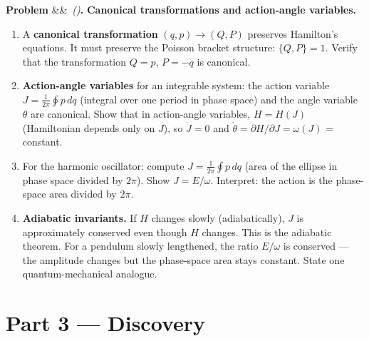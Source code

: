 \documentclass[12pt,a4paper]{article}
\newcounter{problem}
\newenvironment{problem}[1][]{\refstepcounter{problem}\par\vspace{6pt}\noindent\textbf{\color{MidBlue}Problem \theproblem}\ifx&#1&\else\ \textit{(#1)}\fi\textbf{.}\enskip}{\par\vspace{4pt}}
\begin{document}
\begin{problem}
\label{prob:canonical}
\textbf{Canonical transformations and action-angle variables.}
\begin{enumerate}[label=(\alph*),topsep=2pt]
  \item A \textbf{canonical transformation} $(q,p)\to(Q,P)$ preserves Hamilton's equations. It must preserve the Poisson bracket structure: $\{Q,P\}=1$. Verify that the transformation $Q=p$, $P=-q$ is canonical.
  \item \textbf{Action-angle variables} for an integrable system: the action variable $J = \frac{1}{2\pi}\oint p\,dq$ (integral over one period in phase space) and the angle variable $\theta$ are canonical. Show that in action-angle variables, $H = H(J)$ (Hamiltonian depends only on $J$), so $\dot J=0$ and $\dot\theta=\partial H/\partial J = \omega(J)$ = constant.
  \item For the harmonic oscillator: compute $J = \frac{1}{2\pi}\oint p\,dq$ (area of the ellipse in phase space divided by $2\pi$). Show $J=E/\omega$. Interpret: the action is the phase-space area divided by $2\pi$.
  \item \textbf{Adiabatic invariants.} If $H$ changes slowly (adiabatically), $J$ is approximately conserved even though $H$ changes. This is the adiabatic theorem. For a pendulum slowly lengthened, the ratio $E/\omega$ is conserved --- the amplitude changes but the phase-space area stays constant. State one quantum-mechanical analogue.
\end{enumerate}
\end{problem}

\section{Part 3 \texorpdfstring{---}{--} Discovery}
\end{document}
